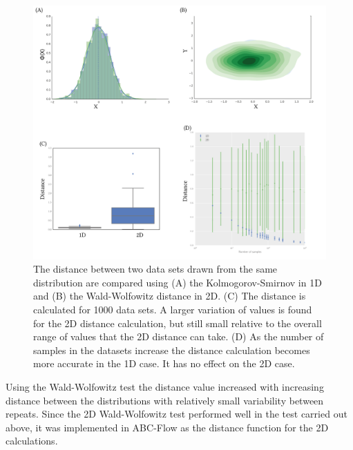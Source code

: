 \begin{figure}[tb]
\centering
\includegraphics[scale=0.7]{../../chapters/chapterABCFlow/images/epsilon_same_box.png}
\caption[Distance calculation expected error using the KS and Wald-Wolfowitz distances]{\label{fig:epsilon_boxplt}The distance between two data sets drawn from the same distribution are compared using (A) the Kolmogorov-Smirnov in 1D and (B) the Wald-Wolfowitz distance in 2D. (C) The distance is calculated for 1000 data sets. A larger variation of values is found for the 2D distance calculation, but still small relative to the overall range of values that the 2D distance can take. (D) As the number of samples in the datasets increase the distance calculation becomes more accurate in the 1D case. It has no effect on the 2D case.}
\end{figure}


Using the Wald-Wolfowitz test the distance value increased with increasing distance between the distributions with relatively small variability between repeats. Since the 2D Wald-Wolfowitz test performed well in the test carried out above, it was implemented in ABC-Flow as the distance function for the 2D calculations.


